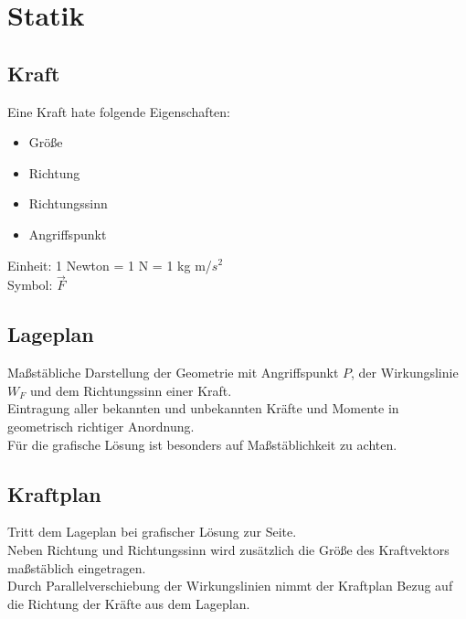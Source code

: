 \documentclass[a4paper,parskip=half*,DIV=7,fontsize=11pt]{scrartcl}
\begin{document}
\pagebreak

\section{Statik}
\subsection{Kraft}
Eine Kraft hate folgende Eigenschaften:\\
\begin{itemize}
	\item Größe
	\item Richtung
	\item Richtungssinn
	\item Angriffspunkt
\end{itemize}
Einheit: 1 Newton = 1 N = 1 kg m/$s^2$\\
Symbol: $\overrightarrow{F}$

\subsection{Lageplan}
Maßstäbliche Darstellung der Geometrie mit Angriffspunkt $P$, der Wirkungslinie $W_F$ und dem Richtungssinn einer Kraft.\\
Eintragung aller bekannten und unbekannten Kräfte und Momente in geometrisch richtiger Anordnung.\\
Für die grafische Lösung ist besonders auf Maßstäblichkeit zu achten.

\subsection{Kraftplan}
Tritt dem Lageplan bei grafischer Lösung zur Seite.\\
Neben Richtung und Richtungssinn wird zusätzlich die Größe des Kraftvektors maßstäblich eingetragen.\\
Durch Parallelverschiebung  der Wirkungslinien nimmt der Kraftplan Bezug auf die Richtung der Kräfte aus dem Lageplan.
\end{document}
